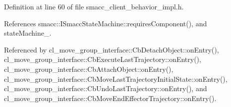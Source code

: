 Definition at line 60 of file smacc\+\_\+client\+\_\+behavior\+\_\+impl.\+h.



References smacc\+::\+I\+Smacc\+State\+Machine\+::requires\+Component(), and state\+Machine\+\_\+.



Referenced by cl\+\_\+move\+\_\+group\+\_\+interface\+::\+Cb\+Detach\+Object\+::on\+Entry(), cl\+\_\+move\+\_\+group\+\_\+interface\+::\+Cb\+Execute\+Last\+Trajectory\+::on\+Entry(), cl\+\_\+move\+\_\+group\+\_\+interface\+::\+Cb\+Attach\+Object\+::on\+Entry(), cl\+\_\+move\+\_\+group\+\_\+interface\+::\+Cb\+Move\+Last\+Trajectory\+Initial\+State\+::on\+Entry(), cl\+\_\+move\+\_\+group\+\_\+interface\+::\+Cb\+Undo\+Last\+Trajectory\+::on\+Entry(), and cl\+\_\+move\+\_\+group\+\_\+interface\+::\+Cb\+Move\+End\+Effector\+Trajectory\+::on\+Entry().


